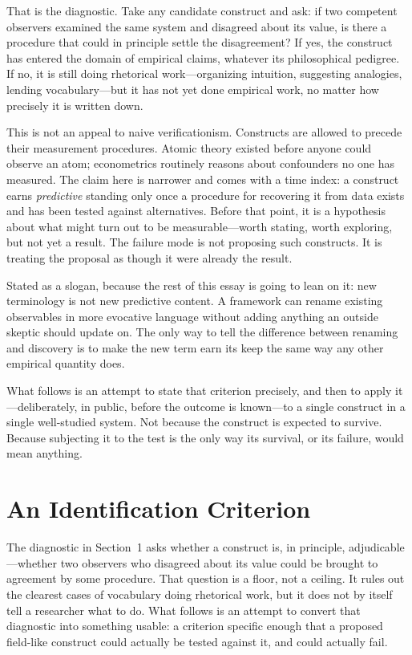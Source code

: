 \documentclass[11pt]{article}
\begin{document}
That is the diagnostic. Take any candidate construct and ask: if two competent observers examined the same system and disagreed about its value, is there a procedure that could in principle settle the disagreement? If yes, the construct has entered the domain of empirical claims, whatever its philosophical pedigree. If no, it is still doing rhetorical work---organizing intuition, suggesting analogies, lending vocabulary---but it has not yet done empirical work, no matter how precisely it is written down.

This is not an appeal to naive verificationism. Constructs are allowed to precede their measurement procedures. Atomic theory existed before anyone could observe an atom; econometrics routinely reasons about confounders no one has measured. The claim here is narrower and comes with a time index: a construct earns \emph{predictive} standing only once a procedure for recovering it from data exists and has been tested against alternatives. Before that point, it is a hypothesis about what might turn out to be measurable---worth stating, worth exploring, but not yet a result. The failure mode is not proposing such constructs. It is treating the proposal as though it were already the result.

Stated as a slogan, because the rest of this essay is going to lean on it: new terminology is not new predictive content. A framework can rename existing observables in more evocative language without adding anything an outside skeptic should update on. The only way to tell the difference between renaming and discovery is to make the new term earn its keep the same way any other empirical quantity does.

What follows is an attempt to state that criterion precisely, and then to apply it---deliberately, in public, before the outcome is known---to a single construct in a single well-studied system. Not because the construct is expected to survive. Because subjecting it to the test is the only way its survival, or its failure, would mean anything.

\section{An Identification Criterion}

The diagnostic in Section~1 asks whether a construct is, in principle, adjudicable---whether two observers who disagreed about its value could be brought to agreement by some procedure. That question is a floor, not a ceiling. It rules out the clearest cases of vocabulary doing rhetorical work, but it does not by itself tell a researcher what to do. What follows is an attempt to convert that diagnostic into something usable: a criterion specific enough that a proposed field-like construct could actually be tested against it, and could actually fail.
\end{document}

